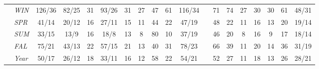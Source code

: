 \begin{table}[htb]
{\begin{tabular}{llccccccccclccccccc}
\parbox[t]{2mm}{}  & \textit{WIN}     & 126/36      & 82/25       & 31          & 93/26       & 31          & 27          & 47          & 61          & 116/34      &  & 71         & 74         & 27         & 30          & 30          & 61          & 48/31                         \\
                        & \textit{SPR}     & 41/14       & 20/12       & 16          & 27/11       & 15          & 11          & 44          & 22          & 47/19       &  & 48         & 22         & 11         & 16          & 13          & 20          & 19/14                         \\
                        & \textit{SUM}     & 33/15       & 13/9        & 16          & 18/8        & 13          & 8           & 80          & 10          & 37/19       &  & 46         & 20         & 8          & 16          & 9           & 17          & 18/14                         \\
                        & \textit{FAL}     & 75/21       & 43/13       & 22          & 57/15       & 21          & 13          & 40          & 31          & 78/23       &  & 66         & 39         & 11         & 20          & 14          & 36          & 31/19                         \\
                        & \textit{Year}    & 50/17       & 26/12       & 18          & 33/11       & 16          & 12          & 58          & 22          & 54/21       &  & 52         & 27         & 11         & 18          & 13          & 26          & 28/21                         \\ \hline
\end{tabular}
}
\end{table}

